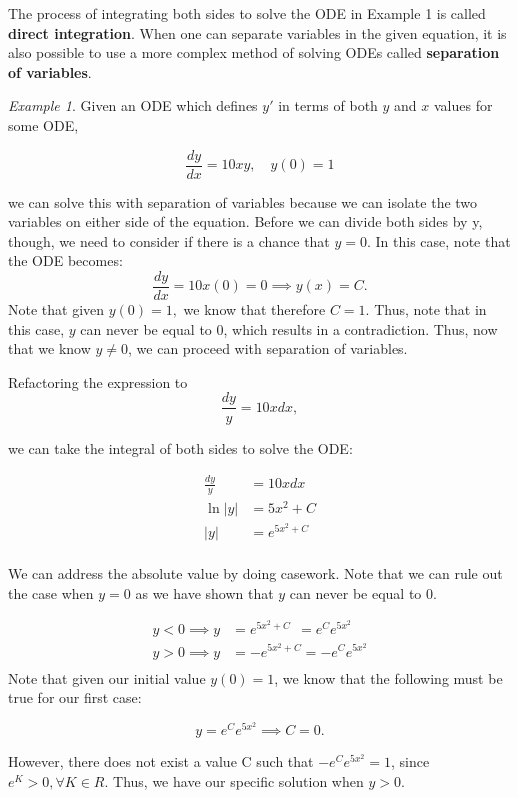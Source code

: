 \documentclass{article}
\theoremstyle{remark}
\newtheorem{example}{Example}
\begin{document}
The process of integrating both sides to solve the ODE in Example 1 is called \textbf{direct integration}. When one can separate variables in the given equation, it is also possible to use a more complex method of solving ODEs called \textbf{separation of variables}. 

\begin{example}
Given an ODE which defines $y'$ in terms of both $y$ and $x$ values for some ODE,

$$ \frac{dy}{dx} = 10xy, \quad y(0) = 1$$

we can solve this with separation of variables because we can isolate the two variables on either side of the equation. Before we can divide both sides by y, though, we need to consider if there is a chance that $y=0$. In this case, note that the ODE becomes:
$$\frac{dy}{dx} = 10x(0) = 0 \implies y(x) = C.$$
Note that given $y(0) = 1,$ we know that therefore $C = 1$. Thus, note that in this case, $y$ can never be equal to 0, which results in a contradiction. Thus, now that we know $y \neq 0$, we can proceed with separation of variables.

Refactoring the expression to
$$  \frac{dy}{y} = 10xdx,$$

we can take the integral of both sides to solve the ODE:

\begin{align*}
\frac{dy}{y} &= 10xdx\\
\ln |y|  &= 5x^2 + C\\
|y| &= e^{5x^2 + C} \\
\end{align*}


We can address the absolute value by doing casework. Note that we can rule out the case when $y=0$ as we have shown that $y$ can never be equal to 0.

\begin{align*}
y<0 \implies y &= e^{5x^2 + C} \ \ = e^Ce^{5x^2}\\
y>0 \implies  y &= -e^{5x^2 + C} = -e^C e^{5x^2}\\
\end{align*}
Note that given our initial value $y(0) = 1$, we know that the following must be true for our first case:

$$y = e^Ce^{5x^2} \implies C = 0.$$

However, there does not exist a value C such that $-e^C e^{5x^2} = 1$, since $e^K > 0, \forall K \in R$. Thus, we have our specific solution when $y>0$.

\end{example}
\end{document}

